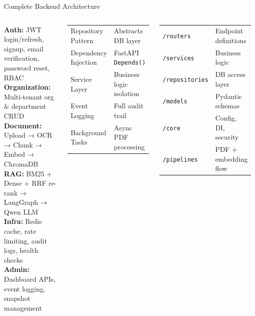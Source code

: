 \documentclass[aspectratio=169,12pt]{beamer}
\begin{document}
\begin{frame}{Complete Backend Architecture}
\begin{columns}[T]
  \begin{tcolorbox}[mybox,title={Backend Modules}]
    \tiny
    \textbf{Auth:} JWT login/refresh, signup, email verification, password reset, RBAC\\[3pt]
    \textbf{Organization:} Multi-tenant org \& department CRUD\\[3pt]
    \textbf{Document:} Upload → OCR → Chunk → Embed → ChromaDB\\[3pt]
    \textbf{RAG:} BM25 + Dense + RRF re-rank → LangGraph → Qwen LLM\\[3pt]
    \textbf{Infra:} Redis cache, rate limiting, audit logs, health checks\\[3pt]
    \textbf{Admin:} Dashboard APIs, event logging, snapshot management
  \end{tcolorbox}
  \vspace{4pt}
  \begin{tcolorbox}[mybox,title={Patterns Used}]
    \tiny
    \begin{tabular}{@{}ll@{}}
    Repository Pattern & Abstracts DB layer\\
    Dependency Injection & FastAPI \texttt{Depends()}\\
    Service Layer & Business logic isolation\\
    Event Logging & Full audit trail\\
    Background Tasks & Async PDF processing\\
    \end{tabular}
  \end{tcolorbox}
  \vspace{4pt}
  \begin{tcolorbox}[mybox,title={Folder Structure (Backend)}]
    \tiny
    \begin{tabular}{@{}ll@{}}
    \texttt{/routers} & Endpoint definitions\\
    \texttt{/services} & Business logic\\
    \texttt{/repositories} & DB access layer\\
    \texttt{/models} & Pydantic schemas\\
    \texttt{/core} & Config, DI, security\\
    \texttt{/pipelines} & PDF + embedding flow\\
    \end{tabular}
  \end{tcolorbox}
\end{columns}
\end{frame}
\end{document}
